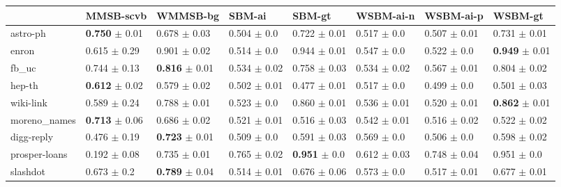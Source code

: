 \begin{tabular}{llllllll}
\hline
               & MMSB-scvb                   & WMMSB-bg                & SBM-ai           & SBM-gt                   & WSBM-ai-n        & WSBM-ai-p        & WSBM-gt                   \\
\hline
 astro-ph      & \textbf{0.750} $\pm$ 0.01 & 0.678 $\pm$ 0.03          & 0.504 $\pm$ 0.0  & 0.722 $\pm$ 0.01         & 0.517 $\pm$ 0.0  & 0.507 $\pm$ 0.01 & 0.731 $\pm$ 0.01          \\
 enron         & 0.615 $\pm$ 0.29          & 0.901 $\pm$ 0.02          & 0.514 $\pm$ 0.0  & 0.944 $\pm$ 0.01         & 0.547 $\pm$ 0.0  & 0.522 $\pm$ 0.0  & \textbf{0.949} $\pm$ 0.01 \\
 fb\_uc         & 0.744 $\pm$ 0.13          & \textbf{0.816} $\pm$ 0.01 & 0.534 $\pm$ 0.02 & 0.758 $\pm$ 0.03         & 0.534 $\pm$ 0.02 & 0.567 $\pm$ 0.01 & 0.804 $\pm$ 0.02          \\
 hep-th        & \textbf{0.612} $\pm$ 0.02 & 0.579 $\pm$ 0.02          & 0.502 $\pm$ 0.01 & 0.477 $\pm$ 0.01         & 0.517 $\pm$ 0.0  & 0.499 $\pm$ 0.0  & 0.501 $\pm$ 0.03          \\
 wiki-link     & 0.589 $\pm$ 0.24          & 0.788 $\pm$ 0.01          & 0.523 $\pm$ 0.0  & 0.860 $\pm$ 0.01         & 0.536 $\pm$ 0.01 & 0.520 $\pm$ 0.01 & \textbf{0.862} $\pm$ 0.01 \\
 moreno\_names  & \textbf{0.713} $\pm$ 0.06 & 0.686 $\pm$ 0.02          & 0.521 $\pm$ 0.01 & 0.516 $\pm$ 0.03         & 0.542 $\pm$ 0.01 & 0.516 $\pm$ 0.02 & 0.522 $\pm$ 0.02          \\
 digg-reply    & 0.476 $\pm$ 0.19          & \textbf{0.723} $\pm$ 0.01 & 0.509 $\pm$ 0.0  & 0.591 $\pm$ 0.03         & 0.569 $\pm$ 0.0  & 0.506 $\pm$ 0.0  & 0.598 $\pm$ 0.02          \\
 prosper-loans & 0.192 $\pm$ 0.08          & 0.735 $\pm$ 0.01          & 0.765 $\pm$ 0.02 & \textbf{0.951} $\pm$ 0.0 & 0.612 $\pm$ 0.03 & 0.748 $\pm$ 0.04 & 0.951 $\pm$ 0.0           \\
 slashdot      & 0.673 $\pm$ 0.2           & \textbf{0.789} $\pm$ 0.04 & 0.514 $\pm$ 0.01 & 0.676 $\pm$ 0.06         & 0.573 $\pm$ 0.0  & 0.517 $\pm$ 0.01 & 0.677 $\pm$ 0.01          \\
\hline
\end{tabular}
